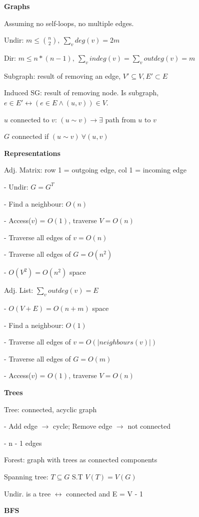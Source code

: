 \documentclass[8pt, letterpaper]{extarticle}
\begin{document}
\noindent
\begin{minipage}[t]{0.45\textwidth}

\textbf{Graphs}

Assuming no self-loops, no multiple edges.

Undir: $m \leq \binom{n}{2},\ \sum_{v}deg(v) = 2m$

Dir: $m \leq n*(n-1),\ \sum_{v}indeg(v) = \sum_{v}outdeg(v) = m$

Subgraph: result of removing an edge, $V' \subseteq V, E' \subset E$

Induced SG: result of removing node. Is subgraph, $e \in E' \leftrightarrow (e \in E \wedge (u, v)) \in V$.

$u$ connected to $v$: $(u \sim v) \rightarrow \exists$ path from $u$ to $v$

$G$ connected if $(u \sim v)\ \forall (u, v)$


\textbf{Representations}

Adj. Matrix: row 1 = outgoing edge, col 1 = incoming edge

- Undir: $G = G^T$

- Find a neighbour: $O(n)$

- Access($v$) = $O(1)$, traverse $V = O(n)$

- Traverse all edges of $v = O(n)$

- Traverse all edges of $G = O(n^2)$ 

- $O(V^2) = O(n^2)$ space

Adj. List: $\sum_{v} outdeg(v) = E$

- $O(V + E) = O(n + m)$ space

- Find a neighbour: $O(1)$

- Traverse all edges of $v = O(|neighbours(v)|)$

- Traverse all edges of $G = O(m)$ 

- Access($v$) = $O(1)$, traverse $V = O(n)$


\textbf{Trees}

Tree: connected, acyclic graph

- Add edge $\rightarrow$ cycle; Remove edge $\rightarrow$ not connected

- n - 1 edges

Forest: graph with trees as connected components

Spanning tree: $T \subseteq G$ S.T $V(T) = V(G)$

Undir. is a tree $\leftrightarrow$ connected and E = V - 1


\textbf{BFS}


\end{minipage}
\end{document}
